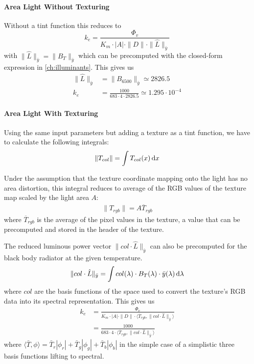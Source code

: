 \paragraph{Area Light Without Texturing} Without a tint function this reduces to
\begin{displaymath}
k_e = \frac{\Phi_v}{K_m \cdot |A| \cdot \|D\| \cdot \|\hat{L}\|_{\bar y} }
\end{displaymath}
with $\|\hat{L}\|_{\bar y} = \|B_T\|_{\bar y}$ which can be precomputed with the
closed-form expression in \cref{ch:illuminants}. This gives us
\begin{align*}
\|\hat{L}\|_{\bar y} &= \|B_{6500}\|_{\bar y} \simeq 2826.5 \\
k_e &= \frac{1000}{683 \cdot 4 \cdot 2826.5 } \simeq 1.295 \cdot 10^{-4}
\end{align*}

\paragraph{Area Light With Texturing}
Using the same input parameters but adding a texture as a tint function,
we have to calculate the following integrals:
\begin{displaymath}
\|T_{col}\| = \int T_{col}(x) \mathop{}\!\mathrm{d} x
\end{displaymath}

Under the assumption that the texture coordinate mapping onto the light has no area
distortion, this integral reduces to average of the \gls{RGB} values of the
texture map scaled by the light area $A$:
\begin{align*}
\|T_{rgb}\| = A \overline{T}_{rgb}
\end{align*}
where $\overline{T}_{rgb}$ is the average of the pixel values in the
texture,
a value that can be precomputed and stored in the header of the texture.

The reduced luminous power vector $\|col\cdot \hat L\|_{\bar y}$ can also
be precomputed for the black body radiator at the given temperature.
\begin{displaymath}
\|col\cdot \hat L\|_{\bar y} = \int col(\lambda) \cdot B_T(\lambda) \cdot \bar y
(\lambda) \mathop{}\!\mathrm{d}\lambda
\end{displaymath}
where $col$ are the basis functions of the space used to convert the texture's
\gls{RGB} data into its spectral representation.
This gives us
\begin{align*}
 k_e &= \frac{\Phi_v}{K_m \cdot |A| \cdot \|D\| \cdot \langle \overline{T}_{rgb}, \|col\cdot\hat{L}\|_{\bar y} \rangle } \\
&= \frac{1000}{683 \cdot 4 \cdot \langle \overline{T}_{rgb}, \|col\cdot\hat{L}\|_{\bar y} \rangle  }
\end{align*}
where $\langle \bar T, \phi \rangle = \bar T_r|\phi_r| + \bar T_g|\phi_g| + \bar T_b|\phi_b| $
in the simple case of a simplistic three basis functions lifting to spectral.

